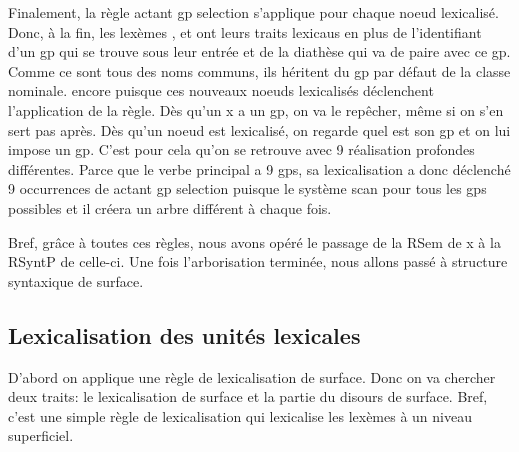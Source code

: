 Finalement, la règle actant gp selection s'applique pour chaque noeud lexicalisé. Donc, à la fin, les lexèmes , et  ont leurs traits lexicaus en plus de l'identifiant d'un gp qui se trouve sous leur entrée et de la diathèse qui va de paire avec ce gp. Comme ce sont tous des noms communs, ils héritent du gp par défaut de la classe nominale. encore puisque ces nouveaux noeuds lexicalisés déclenchent l'application de la règle. Dès qu'un x a un gp, on va le repêcher, même si on s'en sert pas après. Dès qu'un noeud est lexicalisé, on regarde quel est son gp et on lui impose un gp. C'est pour cela qu'on se retrouve avec 9 réalisation profondes différentes. Parce que le verbe principal a 9 gps, sa lexicalisation a donc déclenché 9 occurrences de actant gp selection puisque le système scan pour tous les gps possibles et il créera un arbre différent à chaque fois.

Bref, grâce à toutes ces règles, nous avons opéré le passage de la RSem de x à la RSyntP de celle-ci. Une fois l'arborisation terminée, nous allons passé à structure syntaxique de surface.

\subsection{Lexicalisation des unités lexicales}
D'abord on applique une règle de lexicalisation de surface. Donc on va chercher deux traits: le lexicalisation de surface et la partie du disours de surface. Bref, c'est une simple règle de lexicalisation qui lexicalise les lexèmes à un niveau superficiel.

